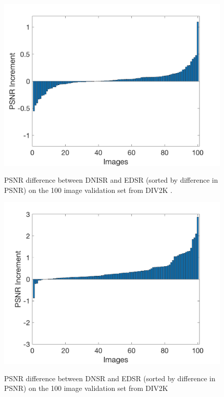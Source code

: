 \documentclass[10pt,twocolumn,letterpaper]{article}
\begin{document}
\begin{figure}[htbp]
\centering
\includegraphics[width=\columnwidth]{Images/Track2DIFF2.png}\\
\caption{PSNR difference between DNISR and EDSR (sorted by difference in PSNR) on the 100 image validation set from DIV2K \cite{Agustsson_2017_CVPR_Workshops}.}
\label{fig:track2diff2}
\end{figure}

\begin{figure}[htbp]
\centering
\includegraphics[width=\columnwidth]{Images/Track2DIFF.png}\\
\caption{PSNR difference between DNSR and EDSR (sorted by difference in PSNR) on the 100 image validation set from DIV2K \cite{Agustsson_2017_CVPR_Workshops}}
\label{fig:track2diff}
\end{figure}
\end{document}
